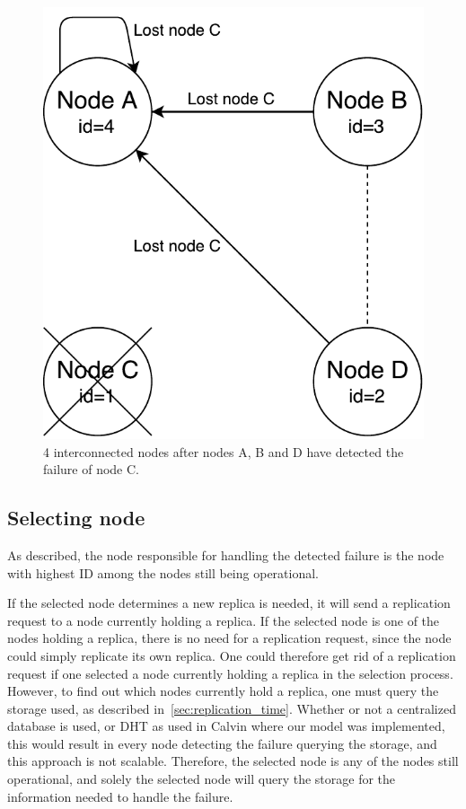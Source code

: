 \documentclass{cslthse-msc}
\begin{document}
\begin{figure}[!hbt]
\centering
\includegraphics[scale=0.5]{images/handling_node_failure.pdf}
\caption{4 interconnected nodes after nodes A, B and D have detected the failure of node C.}\label{fig:handling_node_failure}
\end{figure}

\subsection{Selecting node}
As described, the node responsible for handling the detected failure is the node with highest ID among the nodes still being operational.

If the selected node determines a new replica is needed, it will send a replication request to a node currently holding a replica. If the selected node is one of the nodes holding a replica, there is no need for a replication request, since the node could simply replicate its own replica. One could therefore get rid of a replication request if one selected a node currently holding a replica in the selection process. However, to find out which nodes currently hold a replica, one must query the storage used, as described in~\cref{sec:replication_time}. Whether or not a centralized database is used, or DHT as used in Calvin where our model was implemented, this would result in every node detecting the failure querying the storage, and this approach is not scalable. Therefore, the selected node is any of the nodes still operational, and solely the selected node will query the storage for the information needed to handle the failure.
\end{document}
